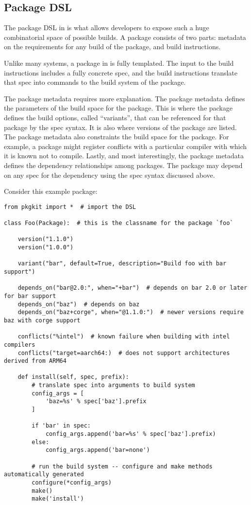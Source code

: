 \subsection{Package DSL}

The package DSL in \spack is what allows developers to expose such a huge combinatorial space of possible builds.
A \spack package consists of two parts: metadata on the requirements for any build of the package, and build instructions.

Unlike many systems, a package in \spack is fully templated.
The input to the build instructions includes a fully concrete spec, and the build instructions translate that spec into commands to the build system of the package.

The package metadata requires more explanation.
The package metadata defines the parameters of the build space for the package.
This is where the package defines the build options, called ``variants'', that can be referenced for that package by the spec syntax.
It is also where versions of the package are listed.
The package metadata also constraints the build space for the package. For example, a package might register conflicts with a particular compiler with which it is known not to compile.
Lastly, and most interestingly, the package metadata defines the dependency relationships among packages.
The package may depend on any spec for the dependency using the spec syntax discussed above.

Consider this example package:

\begin{verbatim}
from pkgkit import *  # import the DSL

class Foo(Package):  # this is the classname for the package `foo`

    version("1.1.0")
    version("1.0.0")

    variant("bar", default=True, description="Build foo with bar support")

    depends_on("bar@2.0:", when="+bar")  # depends on bar 2.0 or later for bar support
    depends_on("baz")  # depends on baz
    depends_on("baz+corge", when="@1.1.0:")  # newer versions require baz with corge support

    conflicts("%intel")  # known failure when building with intel compilers
    conflicts("target=aarch64:)  # does not support architectures derived from ARM64

    def install(self, spec, prefix):
        # translate spec into arguments to build system
        config_args = [
            'baz=%s' % spec['baz'].prefix
        ]

        if 'bar' in spec:
            config_args.append('bar=%s' % spec['baz'].prefix)
        else:
            config_args.append('bar=none')

        # run the build system -- configure and make methods automatically generated
        configure(*config_args)
        make()
        make('install')
\end{verbatim}

